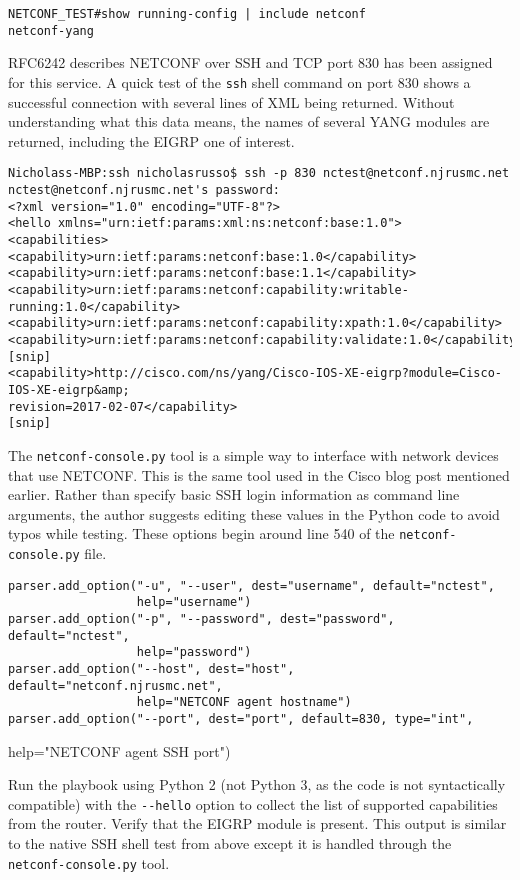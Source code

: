 \begin{verbatim}
NETCONF_TEST#show running-config | include netconf
netconf-yang
\end{verbatim}

RFC6242 describes NETCONF over SSH and TCP port 830 has been assigned for this
service. A quick test of the \verb|ssh| shell command on port 830 shows a
successful connection with several lines of XML being returned. Without
understanding what this data means, the names of several YANG modules are
returned, including the EIGRP one of interest.

\begin{verbatim}
Nicholass-MBP:ssh nicholasrusso$ ssh -p 830 nctest@netconf.njrusmc.net
nctest@netconf.njrusmc.net's password:
<?xml version="1.0" encoding="UTF-8"?>
<hello xmlns="urn:ietf:params:xml:ns:netconf:base:1.0">
<capabilities>
<capability>urn:ietf:params:netconf:base:1.0</capability>
<capability>urn:ietf:params:netconf:base:1.1</capability>
<capability>urn:ietf:params:netconf:capability:writable-running:1.0</capability>
<capability>urn:ietf:params:netconf:capability:xpath:1.0</capability>
<capability>urn:ietf:params:netconf:capability:validate:1.0</capability>
[snip]
<capability>http://cisco.com/ns/yang/Cisco-IOS-XE-eigrp?module=Cisco-IOS-XE-eigrp&amp;
revision=2017-02-07</capability>
[snip]
\end{verbatim}

The \verb|netconf-console.py| tool is a simple way to interface with network
devices that use NETCONF. This is the same tool used in the Cisco blog post
mentioned earlier. Rather than specify basic SSH login information as command
line arguments, the author suggests editing these values in the Python code to
avoid typos while testing. These options begin around line 540 of the
\verb|netconf-console.py| file.

\begin{verbatim}
parser.add_option("-u", "--user", dest="username", default="nctest",
                  help="username")
parser.add_option("-p", "--password", dest="password", default="nctest",
                  help="password")
parser.add_option("--host", dest="host", default="netconf.njrusmc.net",
                  help="NETCONF agent hostname")
parser.add_option("--port", dest="port", default=830, type="int",
\end{verbatim}
                  help="NETCONF agent SSH port")

Run the playbook using Python 2 (not Python 3, as the code is not
syntactically compatible) with the \verb|--hello| option to collect the list of
supported capabilities from the router. Verify that the EIGRP module is
present. This output is similar to the native SSH shell test from above except
it is handled through the \verb|netconf-console.py| tool.


